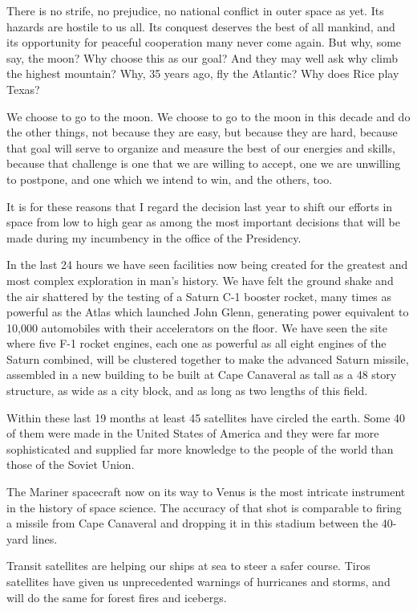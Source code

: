 \documentclass[a4paper]{amsbook}
\begin{document}
There is no strife, no prejudice, no national conflict in outer space as yet. Its hazards are hostile to us all. Its conquest deserves the best of all mankind, and its opportunity for peaceful cooperation many never come again. But why, some say, the moon? Why choose this as our goal? And they may well ask why climb the highest mountain? Why, 35 years ago, fly the Atlantic? Why does Rice play Texas?

We choose to go to the moon. We choose to go to the moon in this decade and do the other things, not because they are easy, but because they are hard, because that goal will serve to organize and measure the best of our energies and skills, because that challenge is one that we are willing to accept, one we are unwilling to postpone, and one which we intend to win, and the others, too.

It is for these reasons that I regard the decision last year to shift our efforts in space from low to high gear as among the most important decisions that will be made during my incumbency in the office of the Presidency.

In the last 24 hours we have seen facilities now being created for the greatest and most complex exploration in man's history. We have felt the ground shake and the air shattered by the testing of a Saturn C-1 booster rocket, many times as powerful as the Atlas which launched John Glenn, generating power equivalent to 10,000 automobiles with their accelerators on the floor. We have seen the site where five F-1 rocket engines, each one as powerful as all eight engines of the Saturn combined, will be clustered together to make the advanced Saturn missile, assembled in a new building to be built at Cape Canaveral as tall as a 48 story structure, as wide as a city block, and as long as two lengths of this field.

Within these last 19 months at least 45 satellites have circled the earth. Some 40 of them were made in the United States of America and they were far more sophisticated and supplied far more knowledge to the people of the world than those of the Soviet Union.

The Mariner spacecraft now on its way to Venus is the most intricate instrument in the history of space science. The accuracy of that shot is comparable to firing a missile from Cape Canaveral and dropping it in this stadium between the 40-yard lines.

Transit satellites are helping our ships at sea to steer a safer course. Tiros satellites have given us unprecedented warnings of hurricanes and storms, and will do the same for forest fires and icebergs.
\end{document}
